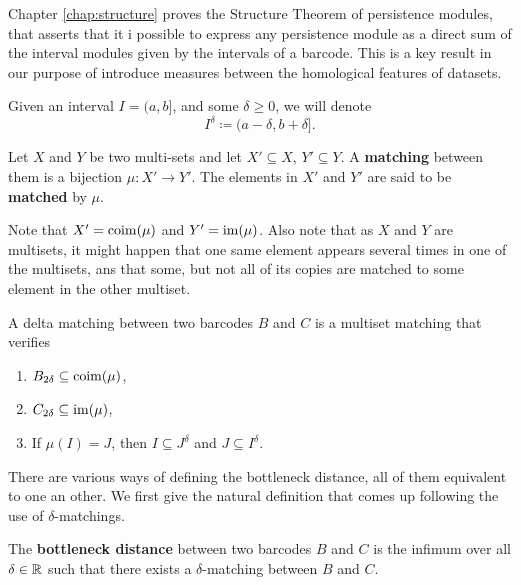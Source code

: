 Chapter \ref{chap:structure} proves the Structure Theorem of persistence modules, that asserts that it i possible to express any persistence module as a direct sum of the interval modules given by the intervals of a barcode. This is a key result in our purpose of introduce measures between the homological features of datasets. 

Given an interval $ I = (a, b]$, and some $ \delta \geq 0 $, we will denote
\begin{equation}
    I^\delta \coloneq (a-\delta, b+\delta].
\end{equation}

\begin{definition}
    Let $ X $ and $ Y $ be two multi-sets and let $ X' \subseteq X $, $ Y' \subseteq Y$. A {\bf matching} between them is a bijection $ \mu \colon X' \to Y' $. The elements in $ X' $ and $ Y' $ are said to be {\bf matched} by $ \mu $.
\end{definition}

Note that $ X' = \operatorname{coim}(\mu) $ and $ Y' = \operatorname{im}(\mu) $. Also note that as $ X $ and $ Y $ are multisets, it might happen that one same element appears several times in one of the multisets, ans that some, but not all of its copies are matched to some element in the other multiset. 

\begin{definition} \label{delta-matching}
    A delta matching between two barcodes $ B $ and $ C $ is a multiset matching that verifies
    \begin{enumerate}
        \item $B_{2\delta} \subseteq \operatorname{coim}(\mu) $,
        \item $C_{2\delta} \subseteq \operatorname{im}(\mu) $,
        \item If $\mu(I) = J$, then $I \subseteq J^\delta$ and $J \subseteq I^\delta$.
    \end{enumerate}
\end{definition}

There are various ways of defining the bottleneck distance, all of them equivalent to one an other. We first give the natural definition that comes up following the use of $\delta$-matchings.

\begin{definition} \label{def:bot-dist}
    The {\bf bottleneck distance} between two barcodes $ B $ and $ C $ is the infimum over all $ \delta \in \mathbb R $ such that there exists a $\delta$-matching between $ B $ and $ C $.
\end{definition}

